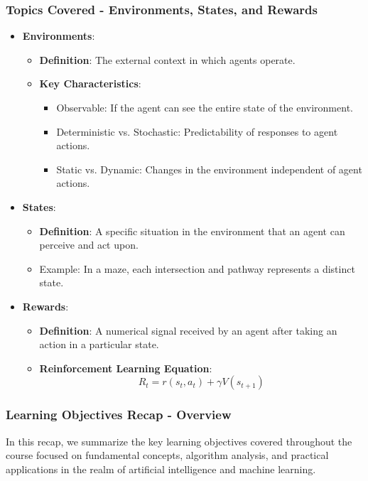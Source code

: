 \documentclass{beamer}
\begin{document}
\begin{frame}[fragile]
    \frametitle{Topics Covered - Environments, States, and Rewards}
    \begin{itemize}
        \item \textbf{Environments}:
        \begin{itemize}
            \item \textbf{Definition}: The external context in which agents operate.
            \item \textbf{Key Characteristics}:
            \begin{itemize}
                \item Observable: If the agent can see the entire state of the environment.
                \item Deterministic vs. Stochastic: Predictability of responses to agent actions.
                \item Static vs. Dynamic: Changes in the environment independent of agent actions.
            \end{itemize}
        \end{itemize}
        
        \item \textbf{States}:
        \begin{itemize}
            \item \textbf{Definition}: A specific situation in the environment that an agent can perceive and act upon.
            \item Example: In a maze, each intersection and pathway represents a distinct state.
        \end{itemize}

        \item \textbf{Rewards}:
        \begin{itemize}
            \item \textbf{Definition}: A numerical signal received by an agent after taking an action in a particular state.
            \item \textbf{Reinforcement Learning Equation}:
            \begin{equation}
                R_t = r(s_t, a_t) + \gamma V(s_{t+1})
            \end{equation}
        \end{itemize}
    \end{itemize}
\end{frame}

\begin{frame}[fragile]
    \frametitle{Learning Objectives Recap - Overview}
    In this recap, we summarize the key learning objectives covered throughout the course focused on fundamental concepts, algorithm analysis, and practical applications in the realm of artificial intelligence and machine learning.
\end{frame}
\end{document}
